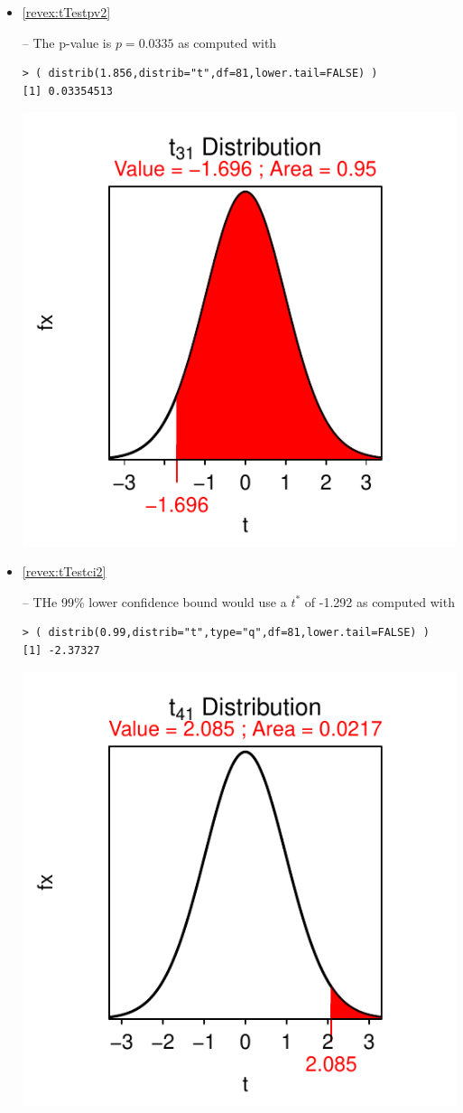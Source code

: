 \documentclass[10pt,openany]{book}\usepackage[]{graphicx}\usepackage[]{color}
\makeatletter
\newenvironment{kframe}{%
 \def\at@end@of@kframe{}%
 \ifinner\ifhmode%
  \def\at@end@of@kframe{\end{minipage}}%
  \begin{minipage}{\columnwidth}%
 \fi\fi%
 \def\FrameCommand##1{\hskip\@totalleftmargin \hskip-\fboxsep
 \colorbox{shadecolor}{##1}\hskip-\fboxsep
     \hskip-\linewidth \hskip-\@totalleftmargin \hskip\columnwidth}%
 \MakeFramed {\advance\hsize-\width
   \@totalleftmargin\z@ \linewidth\hsize
   \@setminipage}}%
 {\par\unskip\endMakeFramed%
 \at@end@of@kframe}
\newenvironment{knitrout}{}{} %
\makeatother
\begin{document}
\begin{itemize}
\begin{knitrout}
{}



\end{knitrout}
  \item \hypertarget{ans:tTestpv2}{\ref{revex:tTestpv2}} -- The p-value is $p=0.0335$ as computed with
\begin{knitrout}
\color{fgcolor}\begin{kframe}
\begin{verbatim}
> ( distrib(1.856,distrib="t",df=81,lower.tail=FALSE) )
[1] 0.03354513
\end{verbatim}
\end{kframe}

{\centering \includegraphics[width=.4\linewidth]{Figs/unnamed-chunk-361-1} 

}



\end{knitrout}
  \item \hypertarget{ans:tTestci2}{\ref{revex:tTestci2}} -- THe 99\% lower confidence bound would use a $t^{*}$ of -1.292 as computed with
\begin{knitrout}
\color{fgcolor}\begin{kframe}
\begin{verbatim}
> ( distrib(0.99,distrib="t",type="q",df=81,lower.tail=FALSE) )
[1] -2.37327
\end{verbatim}
\end{kframe}

{\centering \includegraphics[width=.4\linewidth]{Figs/unnamed-chunk-362-1} 

}
\end{knitrout}
\end{itemize}
\end{document}
